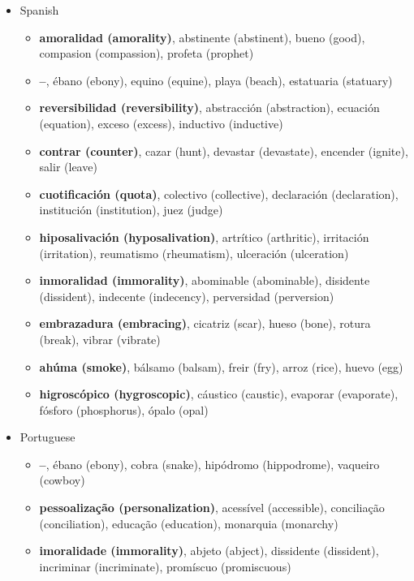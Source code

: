 \documentclass[output=paper]{langsci/langscibook}
\begin{document}
 \label{sec:07:appendix}
 
 \begin{itemize}[leftmargin=*]\sloppy
	\item Spanish
	\begin{itemize}
		\item \textbf{amoralidad (amorality)}, abstinente (abstinent), bueno (good), compasion (compassion), profeta (prophet)
		\item \textbf{--}, ébano (ebony), equino (equine), playa (beach), estatuaria (statuary)
		\item \textbf{reversibilidad (reversibility)}, abstracción (abstraction), ecuación (equation), exceso (excess), inductivo (inductive)
		\item \textbf{contrar (counter)}, cazar (hunt), devastar (devastate), encender (ignite), salir (leave)
		\item \textbf{cuotificación (quota)}, colectivo (collective), declaración (declaration), institución (institution), juez (judge)
		\item \textbf{hiposalivación (hyposalivation)}, artrítico (arthritic), irritación (irritation), reumatismo (rheumatism), ulceración (ulceration)
		\item \textbf{inmoralidad (immorality)}, abominable (abominable), disidente (dissident), indecente (indecency), perversidad (perversion)
		\item \textbf{embrazadura (embracing)}, cicatriz (scar), hueso (bone), rotura (break), vibrar (vibrate)
		\item \textbf{ahúma (smoke)}, bálsamo (balsam), freir (fry), arroz (rice), huevo (egg)
		\item \textbf{higroscópico (hygroscopic)}, cáustico (caustic), evaporar (evaporate), fósforo (phosphorus), ópalo (opal)
	\end{itemize}
	\item Portuguese
	\begin{itemize}
		\item \textbf{--}, ébano (ebony), cobra (snake), hipódromo (hippodrome), vaqueiro (cowboy)
		\item \textbf{pessoalização (personalization)}, acessível (accessible), conciliação (conciliation), educação (education), monarquia (monarchy) 
		\item \textbf{imoralidade (immorality)}, abjeto (abject), dissidente (dissident), incriminar (incriminate), promíscuo (promiscuous)

\end{itemize}
\end{itemize}
\end{document}

